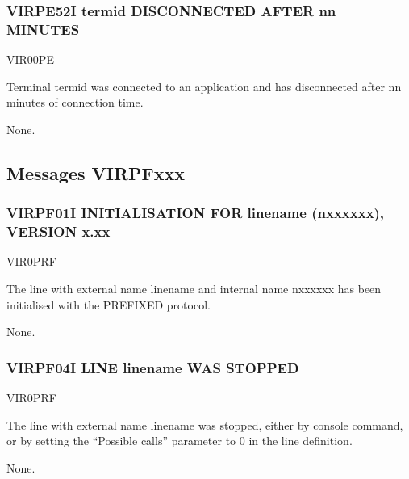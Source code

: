 \documentclass[letterpaper,10pt,english]{sphinxmanual}
\begin{document}
\subsubsection{VIRPE52I termid DISCONNECTED AFTER nn MINUTES}
\label{\detokenize{messages:virpe52i-termid-disconnected-after-nn-minutes}}\begin{description}
\sphinxAtStartPar
VIR00PE

\sphinxAtStartPar
Terminal termid was connected to an application and has disconnected after nn minutes of connection time.

\sphinxAtStartPar
None.

\end{description}


\subsection{Messages VIRPFxxx}
\label{\detokenize{messages:messages-virpfxxx}}

\subsubsection{VIRPF01I INITIALISATION FOR linename (n\sphinxhyphen{}xxxxxx), VERSION x.xx}
\label{\detokenize{messages:virpf01i-initialisation-for-linename-n-xxxxxx-version-x-xx}}\begin{description}
\sphinxAtStartPar
VIR0PRF

\sphinxAtStartPar
The line with external name linename and internal name n\sphinxhyphen{}xxxxxx has been initialised with the PREFIXED protocol.

\sphinxAtStartPar
None.

\end{description}


\subsubsection{VIRPF04I LINE linename WAS STOPPED}
\label{\detokenize{messages:virpf04i-line-linename-was-stopped}}\begin{description}
\sphinxAtStartPar
VIR0PRF

\sphinxAtStartPar
The line with external name linename was stopped, either by console command, or by setting the “Possible calls” parameter to 0 in the line definition.

\sphinxAtStartPar
None.

\end{description}
\end{document}
